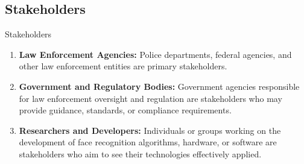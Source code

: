 \subsection{Stakeholders}
\begin{frame}{Stakeholders}
	\begin{enumerate}
		\item \textbf{Law Enforcement Agencies:} Police departments, federal agencies, and other law enforcement entities are primary stakeholders.
		\item \textbf{Government and Regulatory Bodies:} Government agencies responsible for law enforcement oversight and regulation are stakeholders who may provide guidance, standards, or compliance requirements.
		\item \textbf{Researchers and Developers:} Individuals or groups working on the development of face recognition algorithms, hardware, or software are stakeholders who aim to see their technologies effectively applied.
	\end{enumerate}
\end{frame}